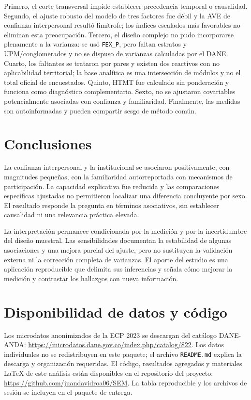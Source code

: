 \documentclass[11pt,letterpaper]{article}
\begin{document}
Primero, el corte transversal impide establecer precedencia temporal o causalidad. Segundo, el ajuste robusto del modelo de tres factores fue débil y la AVE de confianza interpersonal resultó limítrofe; los índices escalados más favorables no eliminan esta preocupación. Tercero, el diseño complejo no pudo incorporarse plenamente a la varianza: se usó \texttt{FEX\_P}, pero faltan estratos y UPM/conglomerados y no se dispuso de varianzas calculadas por el DANE. Cuarto, los faltantes se trataron por pares y existen dos reactivos con no aplicabilidad territorial; la base analítica es una intersección de módulos y no el total oficial de encuestados. Quinto, HTMT fue calculado sin ponderación y funciona como diagnóstico complementario. Sexto, no se ajustaron covariables potencialmente asociadas con confianza y familiaridad. Finalmente, las medidas son autoinformadas y pueden compartir sesgo de método común.

\section{Conclusiones}
\label{sec:conclusiones}

La confianza interpersonal y la institucional se asociaron positivamente, con magnitudes pequeñas, con la familiaridad autorreportada con mecanismos de participación. La capacidad explicativa fue reducida y las comparaciones específicas ajustadas no permitieron localizar una diferencia concluyente por sexo. El resultado responde la pregunta en términos asociativos, sin establecer causalidad ni una relevancia práctica elevada.

La interpretación permanece condicionada por la medición y por la incertidumbre del diseño muestral. Las sensibilidades documentan la estabilidad de algunas asociaciones y una mejora parcial del ajuste, pero no sustituyen la validación externa ni la corrección completa de varianzas. El aporte del estudio es una aplicación reproducible que delimita sus inferencias y señala cómo mejorar la medición y contrastar los hallazgos con nueva información.

\section*{Disponibilidad de datos y código}

Los microdatos anonimizados de la ECP 2023 se descargan del catálogo DANE-ANDA: \url{https://microdatos.dane.gov.co/index.php/catalog/822}. Los datos individuales no se redistribuyen en este paquete; el archivo \texttt{README.md} explica la descarga y organización requeridas. El código, resultados agregados y materiales LaTeX de este análisis están disponibles en el repositorio del proyecto: \url{https://github.com/juandavidroa06/SEM}. La tabla reproducible y los archivos de sesión se incluyen en el paquete de entrega.
\end{document}
